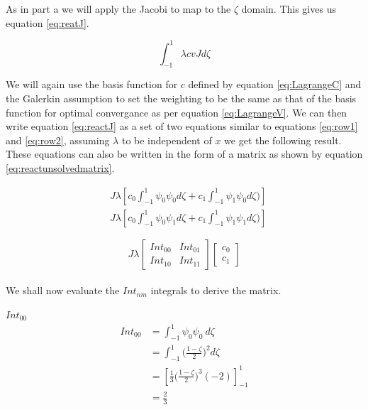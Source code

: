 \documentclass[11pt]{article}
\begin{document}
As in part a we will apply the Jacobi to map to the $\zeta$ domain. This gives us equation \ref{eq:reatJ}.

\begin{equation} \label{eq:reactJ}
\int_{-1}^1 \lambda c v J d\zeta
\end{equation}

We will again use the basis function for $c$ defined by equation \ref{eq:LagrangeC} and the Galerkin assumption to set the weighting to be the same as that of the basis function for optimal convergance as per equation \ref{eq:LagrangeV}. We can then write equation \ref{eq:reactJ} as a set of two equations similar to equations \ref{eq:row1} and \ref{eq:row2}, assuming $\lambda$ to be independent of $x$ we get the following result. These equations can also be written in the form of a matrix as shown by equation \ref{eq:reactunsolvedmatrix}.

\begin{subequations}
\label{eq:reactmatrixform}
\begin{align}
&J \lambda \left  [c_0 \int_{-1}^{1} \psi_{0} \psi_{0} d \zeta + c_1 \int_{-1}^{1} \psi_{1} \psi_{0} d\zeta ) \right ] \label{eq:reactrow1} \\
&J \lambda \left  [c_0 \int_{-1}^{1} \psi_{0} \psi_{1} d \zeta + c_1 \int_{-1}^{1} \psi_{1} \psi_{1} d\zeta ) \right ]  \label{eq:reactrow2} 
\end{align}
\end{subequations}



\begin{equation} \label{eq:reactunsolvedmatrix}
J \lambda
\begin{bmatrix}

Int_{00} & Int_{01} \\
Int_{10} & Int_{11}
\end{bmatrix}
\begin{bmatrix}

c_{0} \\  c_{1} 
\end{bmatrix}
\end{equation}
\\
We shall now evaluate the $Int_{nm}$ integrals to derive the matrix.

\underline{$Int_{00}$} \\
\begin{equation}\label{eq:Int00}
\begin{split}
 Int_{00} &= \int_{-1}^{1} \psi_{0}\psi_{0} \ d \zeta \\
&=  \int_{-1}^{1}  \Big ( \frac{1-\zeta}{2} \Big )^2 d\zeta \\
& = \left[ \frac{1}{3} \Big ( \frac{1-\zeta}{2} \Big )^3 (-2) \right]_{-1}^{1} \\
& = \frac{2}{3}
\end{split}
\end{equation}
\end{document}
